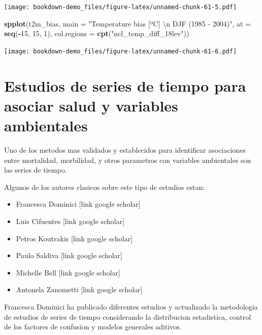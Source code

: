\documentclass[]{book}
\newenvironment{Shaded}{\begin{snugshade}}{\end{snugshade}}
\newcommand{\CharTok}[1]{\textcolor[rgb]{0.31,0.60,0.02}{#1}}
\newcommand{\DataTypeTok}[1]{\textcolor[rgb]{0.13,0.29,0.53}{#1}}
\newcommand{\DecValTok}[1]{\textcolor[rgb]{0.00,0.00,0.81}{#1}}
\newcommand{\KeywordTok}[1]{\textcolor[rgb]{0.13,0.29,0.53}{\textbf{#1}}}
\newcommand{\NormalTok}[1]{#1}
\newcommand{\OperatorTok}[1]{\textcolor[rgb]{0.81,0.36,0.00}{\textbf{#1}}}
\newcommand{\StringTok}[1]{\textcolor[rgb]{0.31,0.60,0.02}{#1}}
\providecommand{\tightlist}{%
  \setlength{\itemsep}{0pt}\setlength{\parskip}{0pt}}
\begin{document}
\texttt{[image: bookdown-demo\_files/figure-latex/unnamed-chunk-61-5.pdf]}

\begin{Shaded}
\begin{Highlighting}[]
\KeywordTok{spplot}\NormalTok{(t2m_bias,}
            \DataTypeTok{main =} \StringTok{"Temperature bias [ºC] }\CharTok{\textbackslash{}n}\StringTok{ DJF (1985 - 2004)"}\NormalTok{,}
            \DataTypeTok{at =} \KeywordTok{seq}\NormalTok{(}\OperatorTok{-}\DecValTok{15}\NormalTok{, }\DecValTok{15}\NormalTok{, }\DecValTok{1}\NormalTok{),}
            \DataTypeTok{col.regions =} \KeywordTok{cpt}\NormalTok{(}\StringTok{"ncl_temp_diff_18lev"}\NormalTok{))}
\end{Highlighting}
\end{Shaded}

\texttt{[image: bookdown-demo\_files/figure-latex/unnamed-chunk-61-6.pdf]}

\hypertarget{estudios-de-series-de-tiempo-para-asociar-salud-y-variables-ambientales}{%
\chapter{Estudios de series de tiempo para asociar salud y variables ambientales}\label{estudios-de-series-de-tiempo-para-asociar-salud-y-variables-ambientales}}

Uno de los metodos mas validados y establecidos para identificar asociaciones entre mortalidad, morbilidad, y otros parametros con variables ambientales son las series de tiempo.

Algunos de los autores clasicos sobre este tipo de estudios estan:

\begin{itemize}
\tightlist
\item
  Francesca Dominici {[}link google scholar{]}
\item
  Luis Cifuentes {[}link google scholar{]}
\item
  Petros Koutrakis {[}link google scholar{]}
\item
  Paulo Saldiva {[}link google scholar{]}
\item
  Michelle Bell {[}link google scholar{]}
\item
  Antonela Zanometti {[}link google scholar{]}
\end{itemize}

Francesca Dominici ha publicado diferentes estudios y actualizado la metodologia de estudios de series de tiempo considerando la distribucion estadistica, control de los factores de confusion y modelos generales aditivos.
\end{document}
